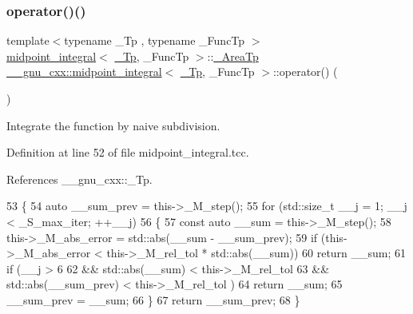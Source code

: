 \subsubsection{\texorpdfstring{operator()()}{operator()()}\hspace{0.1cm}{\footnotesize\ttfamily [1/2]}}
{\footnotesize\ttfamily template$<$typename \+\_\+\+Tp , typename \+\_\+\+Func\+Tp $>$ \\
\hyperlink{class____gnu__cxx_1_1midpoint__integral}{midpoint\+\_\+integral}$<$ \hyperlink{namespace____gnu__cxx_a3b19a9c800ca194374ef9172290f7d79}{\+\_\+\+Tp}, \+\_\+\+Func\+Tp $>$\+::\hyperlink{class____gnu__cxx_1_1midpoint__integral_a43cd31237c2257dd657a2a84fd33dd69}{\+\_\+\+Area\+Tp} \hyperlink{class____gnu__cxx_1_1midpoint__integral}{\+\_\+\+\_\+gnu\+\_\+cxx\+::midpoint\+\_\+integral}$<$ \hyperlink{namespace____gnu__cxx_a3b19a9c800ca194374ef9172290f7d79}{\+\_\+\+Tp}, \+\_\+\+Func\+Tp $>$\+::operator() (\begin{DoxyParamCaption}{ }\end{DoxyParamCaption})}

Integrate the function by naive subdivision. 

Definition at line 52 of file midpoint\+\_\+integral.\+tcc.



References \+\_\+\+\_\+gnu\+\_\+cxx\+::\+\_\+\+Tp.


\begin{DoxyCode}
53     \{
54       \textcolor{keyword}{auto} \_\_sum\_prev = this->\_M\_step();
55       \textcolor{keywordflow}{for} (std::size\_t \_\_j = 1; \_\_j < \_S\_max\_iter; ++\_\_j)
56         \{
57           \textcolor{keyword}{const} \textcolor{keyword}{auto} \_\_sum = this->\_M\_step();
58           this->\_M\_abs\_error = std::abs(\_\_sum - \_\_sum\_prev);
59           \textcolor{keywordflow}{if} (this->\_M\_abs\_error < this->\_M\_rel\_tol * std::abs(\_\_sum))
60             \textcolor{keywordflow}{return} \_\_sum;
61           \textcolor{keywordflow}{if} (\_\_j > 6
62               && std::abs(\_\_sum) < this->\_M\_rel\_tol
63               && std::abs(\_\_sum\_prev) < this->\_M\_rel\_tol )
64             \textcolor{keywordflow}{return} \_\_sum;
65           \_\_sum\_prev = \_\_sum;
66         \}
67       \textcolor{keywordflow}{return} \_\_sum\_prev;
68     \}
\end{DoxyCode}
\mbox{\label{class____gnu__cxx_1_1midpoint__integral_aecb7f4b62849fe4d6b8a0f5cb2c6319f}} 
